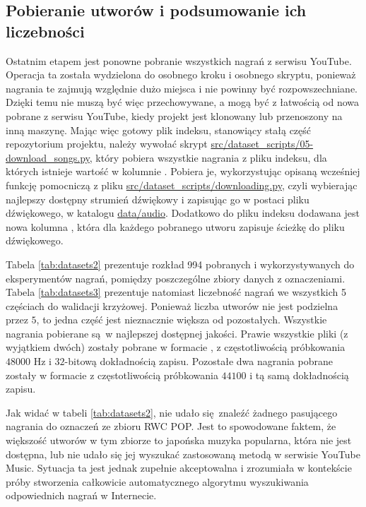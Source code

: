 \subsection{Pobieranie utworów i podsumowanie ich liczebności}

Ostatnim etapem jest ponowne pobranie wszystkich nagrań z serwisu YouTube. Operacja ta została wydzielona do osobnego kroku i osobnego skryptu, ponieważ nagrania te zajmują względnie dużo miejsca i nie powinny być rozpowszechniane. Dzięki temu nie muszą być więc przechowywane, a mogą być z łatwością od nowa pobrane z serwisu YouTube, kiedy projekt jest klonowany lub przenoszony na inną maszynę. Mając więc gotowy plik indeksu, stanowiący stałą część repozytorium projektu, należy wywołać skrypt \url{src/dataset_scripts/05-download_songs.py}, który pobiera wszystkie nagrania z pliku indeksu, dla których istnieje wartość w kolumnie . Pobiera je, wykorzystując opisaną wcześniej funkcję pomocniczą z pliku \url{src/dataset_scripts/downloading.py}, czyli wybierając najlepszy dostępny strumień dźwiękowy i zapisując go w postaci pliku dźwiękowego, w katalogu \url{data/audio}. Dodatkowo do pliku indeksu dodawana jest nowa kolumna , która dla każdego pobranego utworu zapisuje ścieżkę do pliku dźwiękowego.

Tabela \ref{tab:datasets2} prezentuje rozkład 994 pobranych i wykorzystywanych do eksperymentów nagrań, pomiędzy poszczególne zbiory danych z oznaczeniami. Tabela \ref{tab:datasets3} prezentuje natomiast liczebność nagrań we wszystkich 5 częściach do walidacji krzyżowej. Ponieważ liczba utworów nie jest podzielna przez $5$, to jedna część jest nieznacznie większa od pozostałych.  Wszystkie nagrania pobierane są w najlepszej dostępnej jakości. Prawie wszystkie pliki (z wyjątkiem dwóch) zostały pobrane w formacie , z częstotliwością próbkowania $48000$ Hz i $32$-bitową dokładnością zapisu. Pozostałe dwa nagrania pobrane zostały w formacie  z częstotliwością próbkowania $44100$ i tą samą dokładnością zapisu.

Jak widać w tabeli \ref{tab:datasets2}, nie udało się znaleźć żadnego pasującego nagrania do oznaczeń ze zbioru RWC POP. Jest to spowodowane faktem, że większość utworów w tym zbiorze to japońska muzyka popularna, która nie jest dostępna, lub nie udało się jej wyszukać zastosowaną metodą w serwisie YouTube Music. Sytuacja ta jest jednak zupełnie akceptowalna i zrozumiała w kontekście próby stworzenia całkowicie automatycznego algorytmu wyszukiwania odpowiednich nagrań w Internecie.

